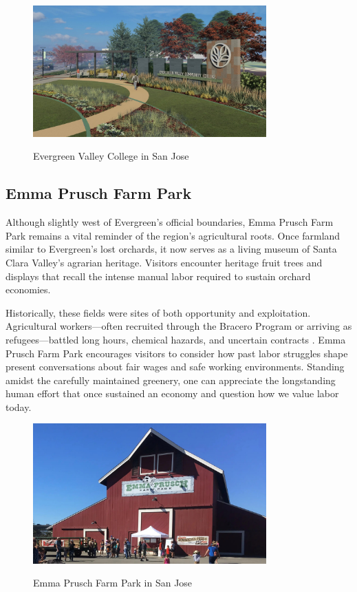 \documentclass[12pt]{article}
\begin{document}
\begin{figure}[h]
  \centering
  \includegraphics[width=0.8\textwidth]{assets/evc_entry.png}
  \caption{Evergreen Valley College in San Jose}
  \label{fig:evc_entry}
  \cite{a2014sjeccd}
\end{figure}

\subsection{Emma Prusch Farm Park}

Although slightly west of Evergreen’s official boundaries, Emma Prusch Farm Park remains a vital reminder of the region’s agricultural roots. Once farmland similar to Evergreen’s lost orchards, it now serves as a living museum of Santa Clara Valley’s agrarian heritage. Visitors encounter heritage fruit trees and displays that recall the intense manual labor required to sustain orchard economies.

Historically, these fields were sites of both opportunity and exploitation. Agricultural workers—often recruited through the Bracero Program or arriving as refugees—battled long hours, chemical hazards, and uncertain contracts \cite{cohen2011braceros, pitti2018the}. Emma Prusch Farm Park encourages visitors to consider how past labor struggles shape present conversations about fair wages and safe working environments. Standing amidst the carefully maintained greenery, one can appreciate the longstanding human effort that once sustained an economy and question how we value labor today.

\begin{figure}[h]
  \centering
  \includegraphics[width=0.8\textwidth]{assets/emma_prusch_farm.png}
  \caption{Emma Prusch Farm Park in San Jose}
  \label{fig:emma_prusch_farm}
  \cite{cruz2024peninsula}
\end{figure}
\end{document}
